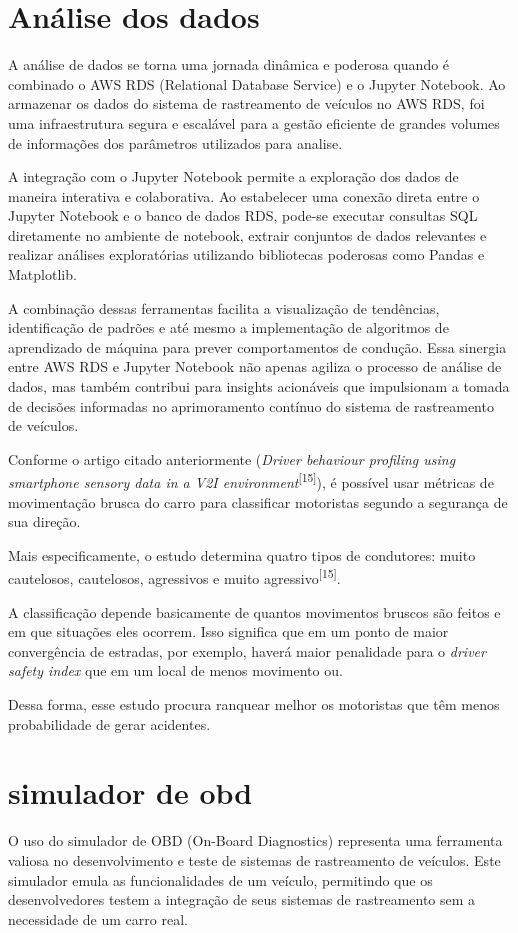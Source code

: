 \section{Análise dos dados}
A análise de dados se torna uma jornada dinâmica e poderosa quando é combinado o AWS RDS (Relational Database Service) e o Jupyter Notebook. Ao armazenar os dados do sistema de rastreamento de veículos no AWS RDS, foi uma infraestrutura segura e escalável para a gestão eficiente de grandes volumes de informações dos parâmetros utilizados para analise. 

A integração com o Jupyter Notebook permite a exploração dos dados de maneira interativa e colaborativa. Ao estabelecer uma conexão direta entre o Jupyter Notebook e o banco de dados RDS, pode-se executar consultas SQL diretamente no ambiente de notebook, extrair conjuntos de dados relevantes e realizar análises exploratórias utilizando bibliotecas poderosas como Pandas e Matplotlib. 

A combinação dessas ferramentas facilita a visualização de tendências, identificação de padrões e até mesmo a implementação de algoritmos de aprendizado de máquina para prever comportamentos de condução. Essa sinergia entre AWS RDS e Jupyter Notebook não apenas agiliza o processo de análise de dados, mas também contribui para insights acionáveis que impulsionam a tomada de decisões informadas no aprimoramento contínuo do sistema de rastreamento de veículos.

Conforme o artigo citado anteriormente (\textit{Driver behaviour profiling using smartphone sensory data in a V2I environment}\textsuperscript{[15]}), é possível usar métricas de movimentação brusca do carro para classificar motoristas segundo a segurança de sua direção.

Mais especificamente, o estudo determina quatro tipos de condutores: muito cautelosos, cautelosos, agressivos e muito agressivo\textsuperscript{[15]}.

A classificação depende basicamente de quantos movimentos bruscos são feitos e em que situações eles ocorrem. Isso significa que em um ponto de maior convergência de estradas, por exemplo, haverá maior penalidade para o \textit{driver safety index} que em um local de menos movimento ou.

Dessa forma, esse estudo procura ranquear melhor os motoristas que têm menos probabilidade de gerar acidentes.

\section{simulador de obd}
O uso do simulador de OBD (On-Board Diagnostics) representa uma ferramenta valiosa no desenvolvimento e teste de sistemas de rastreamento de veículos. Este simulador emula as funcionalidades de um veículo, permitindo que os desenvolvedores testem a integração de seus sistemas de rastreamento sem a necessidade de um carro real.

